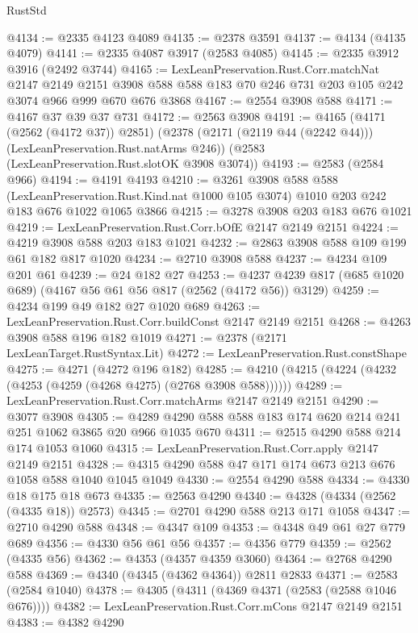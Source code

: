 \begin{lexlean}{RustStd}
\begin{coremodule}
@4134 := @2335 @4123 @4089
@4135 := @2378 @3591
@4137 := @4134 (@4135 @4079)
@4141 := @2335 @4087 @3917 (@2583 @4085)
@4145 := @2335 @3912 @3916 (@2492 @3744)
@4165 := LexLeanPreservation.Rust.Corr.matchNat
    @2147
    @2149
    @2151
    @3908
    @588
    @588
    @183
    @70
    @246
    @731
    @203
    @105
    @242
    @3074
    @966
    @999
    @670
    @676
    @3868
@4167 := @2554 @3908 @588
@4171 := @4167 @37 @39 @37 @731
@4172 := @2563 @3908
@4191 := @4165
    (@4171 (@2562 (@4172 @37)) @2851)
    (@2378 (@2171 (@2119 @44 (@2242 @44))) (LexLeanPreservation.Rust.natArms @246))
    (@2583 (LexLeanPreservation.Rust.slotOK @3908 @3074))
@4193 := @2583 (@2584 @966)
@4194 := @4191 @4193
@4210 := @3261
    @3908
    @588
    @588
    (LexLeanPreservation.Rust.Kind.nat @1000 @105 @3074)
    @1010
    @203
    @242
    @183
    @676
    @1022
    @1065
    @3866
@4215 := @3278 @3908 @203 @183 @676 @1021
@4219 := LexLeanPreservation.Rust.Corr.bOfE @2147 @2149 @2151
@4224 := @4219 @3908 @588 @203 @183 @1021
@4232 := @2863 @3908 @588 @109 @199 @61 @182 @817 @1020
@4234 := @2710 @3908 @588
@4237 := @4234 @109 @201 @61
@4239 := @24 @182 @27
@4253 := @4237 @4239 @817 (@685 @1020 @689) (@4167 @56 @61 @56 @817 (@2562 (@4172 @56)) @3129)
@4259 := @4234 @199 @49 @182 @27 @1020 @689
@4263 := LexLeanPreservation.Rust.Corr.buildConst @2147 @2149 @2151
@4268 := @4263 @3908 @588 @196 @182 @1019
@4271 := @2378 (@2171 LexLeanTarget.RustSyntax.Lit)
@4272 := LexLeanPreservation.Rust.constShape
@4275 := @4271 (@4272 @196 @182)
@4285 := @4210 (@4215 (@4224 (@4232 (@4253 (@4259 (@4268 @4275) (@2768 @3908 @588))))))
@4289 := LexLeanPreservation.Rust.Corr.matchArms @2147 @2149 @2151
@4290 := @3077 @3908
@4305 := @4289 @4290 @588 @588 @183 @174 @620 @214 @241 @251 @1062 @3865 @20 @966 @1035 @670
@4311 := @2515 @4290 @588 @214 @174 @1053 @1060
@4315 := LexLeanPreservation.Rust.Corr.apply @2147 @2149 @2151
@4328 := @4315 @4290 @588 @47 @171 @174 @673 @213 @676 @1058 @588 @1040 @1045 @1049
@4330 := @2554 @4290 @588
@4334 := @4330 @18 @175 @18 @673
@4335 := @2563 @4290
@4340 := @4328 (@4334 (@2562 (@4335 @18)) @2573)
@4345 := @2701 @4290 @588 @213 @171 @1058
@4347 := @2710 @4290 @588
@4348 := @4347 @109
@4353 := @4348 @49 @61 @27 @779 @689
@4356 := @4330 @56 @61 @56
@4357 := @4356 @779
@4359 := @2562 (@4335 @56)
@4362 := @4353 (@4357 @4359 @3060)
@4364 := @2768 @4290 @588
@4369 := @4340 (@4345 (@4362 @4364)) @2811 @2833
@4371 := @2583 (@2584 @1040)
@4378 := @4305 (@4311 (@4369 @4371 (@2583 (@2588 @1046 @676))))
@4382 := LexLeanPreservation.Rust.Corr.mCons @2147 @2149 @2151
@4383 := @4382 @4290

\end{coremodule}
\end{lexlean}
